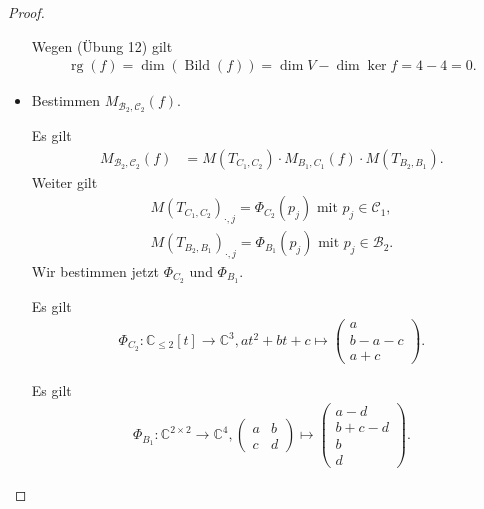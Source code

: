 \documentclass[12pt]{extarticle}
\newcommand{\mg}[1]{\mathbb{#1}}
\newcommand{\mc}[1]{\mathcal{#1}}
\newcommand{\Bild}{\operatorname{Bild}}
\newcommand{\rg}{\operatorname{rg}}
\begin{document}
\begin{proof}
\begin{itemize}
  Wegen (Übung 12) gilt
\begin{align*}
  \rg(f) = \dim(\Bild(f)) = \dim V - \dim \ker f = 4 - 4
  = 0.
\end{align*}
\item Bestimmen \(M_{\mc{B}_2,\mc{C}_2}(f)\).

  Es gilt
\begin{align*}
  M_{\mc{B}_2,\mc{C}_2}(f)
  &= M(T_{C_1,C_2}) \cdot  M_{B_1,C_1}(f) \cdot
    M(T_{B_2,B_1}).
\end{align*}
Weiter gilt
\begin{align*}
  M(T_{C_1,C_2})_{\cdot,j} = \Phi_{C_2}(p_j) \text{ mit }
  p_j \in \mc{C}_1, \\
  M(T_{B_2,B_1})_{\cdot,j} = \Phi_{B_1}(p_j) \text{ mit }  p_j \in \mc{B}_2.
\end{align*}
Wir bestimmen jetzt \(\Phi_{C_2}\) und \(\Phi_{B_1}\).

Es gilt
\begin{align*}
\Phi_{C_2} \colon \mg{C}_{\le 2}[t] \to \mg{C}^3, at^2 +
  bt + c \mapsto
\begin{pmatrix}
  a \\
  b - a - c \\
  a + c
\end{pmatrix}.
\end{align*}

Es gilt
\begin{align*}
  \Phi_{B_1} \colon \mg{C}^{2 \times 2} \to \mg{C}^4,
\begin{pmatrix}
  a & b \\
  c & d
\end{pmatrix}
  \mapsto
\begin{pmatrix}
  a - d \\
  b + c - d \\
  b \\
  d
\end{pmatrix}.
\end{align*}


\end{itemize}
\end{proof}
\end{document}
